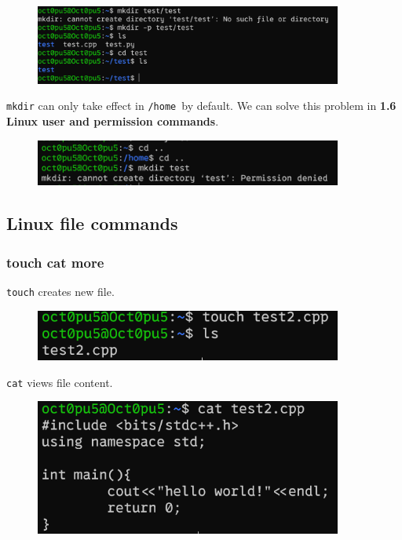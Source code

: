 \documentclass[12pt]{ctexart}
\newenvironment{mdquote}
{%
  \par\noindent
  \begin{list}{}{%
      \setlength{\leftmargin}{1em}%
      \setlength{\rightmargin}{0pt}%
      \setlength{\itemindent}{0pt}%
      \setlength{\listparindent}{\parindent}%
      \setlength{\topsep}{0.5\baselineskip}%
  }
  \item[\textbf{>}\ ]\itshape
}
{\end{list}\par}
\begin{document}
\begin{figure}[H]
    \centering
    \includegraphics[width=0.9\textwidth,keepaspectratio]{assets/Linux/1.4 Linux directory structure and command/6.png}
\end{figure}

\begin{mdquote}
\texttt{mkdir} can only take effect in \texttt{/home}\ by default. We can
solve this problem in \textbf{1.6 Linux user and permission commands}.
\end{mdquote}

\begin{figure}[H]
    \centering
    \includegraphics[width=0.9\textwidth,keepaspectratio]{assets/Linux/1.4 Linux directory structure and command/7.png}
\end{figure}

\newpage
\subsection{\textbf{Linux file commands}}
\subsubsection{\textbf{touch cat more}}

\texttt{touch} creates new file.

\begin{figure}[H]
    \centering
    \includegraphics[width=0.9\textwidth,keepaspectratio]{assets/Linux/1.5 Linux file commands/1.png}
\end{figure}

\texttt{cat} views file content.

\begin{figure}[H]
    \centering
    \includegraphics[width=0.9\textwidth,keepaspectratio]{assets/Linux/1.5 Linux file commands/2.png}
\end{figure}
\end{document}
